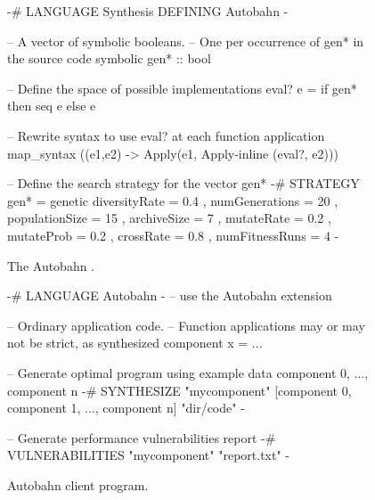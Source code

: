 \begin{figure}[t]

\centering
\begin{mylisting}
{-# LANGUAGE Synthesis DEFINING Autobahn -}

-- A vector of symbolic booleans. 
-- One per occurrence of gen* in the source code symbolic gen* :: bool

-- Define the space of possible implementations
eval? e = if gen* then seq e else e

-- Rewrite syntax to use eval? at each function application
map_syntax (\Apply(e1,e2) -> Apply(e1, Apply-inline (eval?, e2)))

-- Define the search strategy for the vector gen*
{-# STRATEGY gen* =
    genetic { diversityRate = 0.4
            , numGenerations = 20
            , populationSize = 15
            , archiveSize = 7
            , mutateRate = 0.2
            , mutateProb = 0.2
            , crossRate = 0.8
            , numFitnessRuns = 4 }
-}
\end{mylisting}
\caption{The Autobahn \rasp.
}
\label{fig:autobahn-via-synthesis}
\end{figure}

\begin{figure}[t]

\centering
\begin{mylisting}
{-# LANGUAGE Autobahn -}    -- use the Autobahn extension

-- Ordinary application code.
-- Function applications may or may not be strict, as synthesized
component x = ...

-- Generate optimal program using example data component 0, ..., component n
{-# SYNTHESIZE "mycomponent"
        [component 0, component 1, ..., component n] "dir/code" -}

-- Generate performance vulnerabilities report
{-# VULNERABILITIES "mycomponent" "report.txt" -}
\end{mylisting}
\caption{Autobahn client program.}
\label{fig:autobahn-client}
\end{figure}

